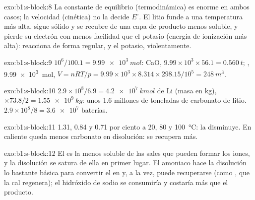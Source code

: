 \begin{solution}{exo:b1:s-block:8}
La constante de equilibrio (termodinámica) es enorme en ambos casos; la
velocidad (cinética) no la decide $E^\circ$. El litio funde a una
temperatura más alta, sigue sólido y se recubre de una capa de producto
menos soluble, y pierde su electrón con menos facilidad que el potasio
(energía de ionización más alta): reacciona de forma regular, y el
potasio, violentamente.
\end{solution}

\begin{solution}{exo:b1:s-block:9}
$10^6/100.1 = \qty{9.99e3}{mol}$: CaO, $9.99 \times 10^3 \times 56.1 =
\qty{0.560}{t}$; , \qty{9.99e3}{mol}, $V = nRT/p = 9.99 \times 10^3
\times 8.314 \times 298.15/10^5 = \qty{248}{m^3}$.
\end{solution}

\begin{solution}{exo:b1:s-block:10}
$2.9 \times 10^8/6.9 = \qty{4.2e7}{kmol}$ de Li (masa en kg), $\times 73.8/2 =
\qty{1.55e9}{kg}$: unos 1.6 millones de toneladas de carbonato de litio.
$2.9 \times 10^8/8 = \num{3.6e7}$ baterías.
\end{solution}

\begin{solution}{exo:b1:s-block:11}
1.31, 0.84 y 0.71 por ciento a 20, 80 y \qty{100}{\celsius}: la
 disminuye. En caliente queda menos carbonato en disolución:
se recupera más.
\end{solution}

\begin{solution}{exo:b1:s-block:12}
El  es la menos soluble de las sales que pueden formar los
iones, y la disolución se satura de ella en primer lugar. El amoniaco
hace la disolución lo bastante básica para convertir el  en
 y, a la vez, puede recuperarse (como , que la cal
regenera); el hidróxido de sodio se consumiría y costaría más que el
producto.
\end{solution}

